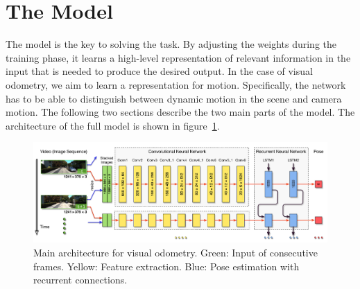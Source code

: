 	
	\section{The Model}
		The model is the key to solving the task.
		By adjusting the weights during the training phase, it learns a high-level representation of relevant information in the input that is needed to produce the desired output.
		In the case of visual odometry, we aim to learn a representation for motion.
		Specifically, the network has to be able to distinguish between dynamic motion in the scene and camera motion.
		The following two sections describe the two main parts of the model.
		The architecture of the full model is shown in figure~\ref{fig:main-architecture}.
		\begin{figure}[t]
			\centering
			\includegraphics[width=\linewidth]{Images/Model/DeepVO-arch}
			\caption[Main architecture for visual odometry]
					{Main architecture for visual odometry.
					 Green: Input of consecutive frames.
					 Yellow: Feature extraction.
					 Blue: Pose estimation with recurrent connections.
					 \label{fig:main-architecture}}
		\end{figure}
		

